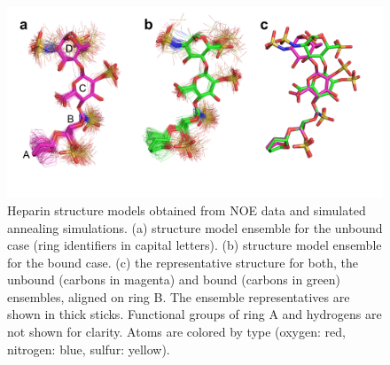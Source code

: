 \begin{figure}
\centering
\includegraphics[width=\textwidth]{gfx/nmr/Figure_07_bound_vs_free_three_panels_05.png}
\caption[]{
Heparin structure models obtained from NOE data and simulated annealing
simulations. (a) structure model ensemble for the unbound case (ring identifiers
in capital letters). (b) structure model ensemble for the bound case. (c) the
representative structure for both, the unbound (carbons in magenta) and bound
(carbons in green) ensembles, aligned on ring B. The ensemble representatives
are shown in thick sticks. Functional groups of ring A and hydrogens are not
shown for clarity. Atoms are colored by type (oxygen: red, nitrogen: blue,
sulfur: yellow).
}
\label{fig:nmr:hp_ensembles_representatives}
\end{figure}


